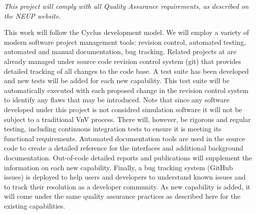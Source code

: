 \textit{This project will comply with all Quality Assurance requirements, as
described on the NEUP website.}

This work will follow the Cyclus development model.  We will employ a variety
of modern software project management tools: revision control, automated
testing, automated and manual documentation, bug tracking. Related projects at
are already managed under source code revision control system (git) that
provides detailed tracking of all changes to the code base. A test suite has
been developed and new tests will be added for each new capability. This test
suite will be automatically executed with each proposed change in the revision
control system to identify any flaws that may be introduced. Note that since
any software developed under this project is not considred simulation software
it will not be subject to a traditional \gls{VnV} process.  There will,
however, be rigorous and regular testing, including continuous integration
tests to ensure it is meeting its functional requirements. Automated
documentation tools are used in the source code to create a detailed reference
for the interfaces and additional background documentation. Out-of-code
detailed reports and publications will supplement the information on each new
capability.  Finally, a bug tracking system (GitHub issues) is deployed to
help users and developers to understand known issues and to track their
resolution as a developer community. As new capability is added, it will come
under the same quality assurance practices as described here for the existing
capabilities.
